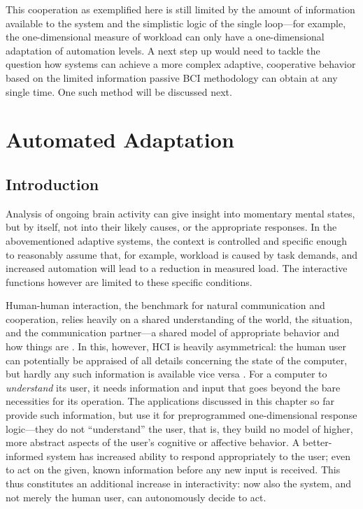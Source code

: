This cooperation as exemplified here is still limited by the amount of information available to the system and the simplistic logic of the single loop---for example, the one-dimensional measure of workload can only have a one-dimensional adaptation of automation levels. A next step up would need to tackle the question how systems can achieve a more complex adaptive, cooperative behavior based on the limited information passive BCI methodology can obtain at any single time. One such method will be discussed next.


\section{Automated Adaptation}
\label{pbci:automated}

\subsection{Introduction}

Analysis of ongoing brain activity can give insight into momentary mental states, but by itself, not into their likely causes, or the appropriate responses. In the abovementioned adaptive systems, the context is controlled and specific enough to reasonably assume that, for example, workload is caused by task demands, and increased automation will lead to a reduction in measured load. The interactive functions however are limited to these specific conditions.

Human-human interaction, the benchmark for natural communication and cooperation, relies heavily on a shared understanding of the world, the situation, and the communication partner---a shared model of appropriate behavior and how things are \cite{fischer2001usermodeling}. In this, however, HCI is heavily asymmetrical: the human user can potentially be appraised of all details concerning the state of the computer, but hardly any such information is available vice versa \cite{suchman1987hmcproblems}. For a computer to \emph{understand} its user, it needs information and input that goes beyond the bare necessities for its operation. The applications discussed in this chapter so far provide such information, but use it for preprogrammed one-dimensional response logic---they do not ``understand'' the user, that is, they build no model of higher, more abstract aspects of the user's cognitive or affective behavior. A better-informed system has increased ability to respond appropriately to the user; even to act on the given, known information before any new input is received. This thus constitutes an additional increase in interactivity: now also the system, and not merely the human user, can autonomously decide to act.

